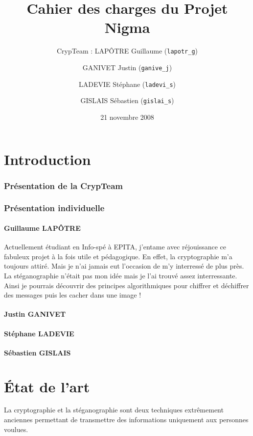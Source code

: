 \documentclass[a4paper,12pt]{article}
\title{Cahier des charges du Projet Nigma}
\author{CrypTeam : LAPÔTRE Guillaume (\texttt{lapotr\_g}) \and GANIVET Justin (\texttt{ganive\_j}) \and LADEVIE Stéphane (\texttt{ladevi\_s}) \and GISLAIS Sébastien (\texttt{gislai\_s})}
\date{21 novembre 2008}
\begin{document}
\maketitle{}
\newpage
\tableofcontents
\newpage
\part{Introduction}

\section {Présentation de la CrypTeam}

\section {Présentation individuelle}

\subsection{Guillaume LAPÔTRE}

Actuellement étudiant en Info-spé à EPITA, j'entame avec réjouissance ce fabuleux projet à la fois utile et pédagogique. En effet, la cryptographie m'a toujours attiré. Mais je n'ai jamais eut l'occasion de m'y interressé de plus près. La stéganographie n'était pas mon idée mais je l'ai trouvé assez interressante. Ainsi je pourrais découvrir des principes algorithmiques pour chiffrer et déchiffrer des messages puis les cacher dans une image ! 

\subsection{Justin GANIVET}

\subsection{Stéphane LADEVIE}

\subsection{Sébastien GISLAIS}

\newpage

\part{\'{E}tat de l'art}
La cryptographie et la stéganographie sont deux techniques extrêmement anciennes permettant de transmettre des informations uniquement aux personnes voulues.
\end{document}
